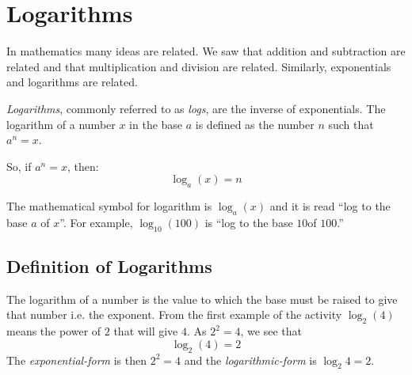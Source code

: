 \chapter{Logarithms}
\label{m:f12:logarithms}


In mathematics many ideas are related. We saw that addition and subtraction are related and that multiplication and division are related. Similarly, exponentials and logarithms are related. 

\textit{Logarithms}, commonly referred to as \textit{logs}, are the inverse of exponentials. The logarithm of a number $x$ in the base $a$ is defined as the number $n$ such that $a^n = x$. 

So, if $a^n = x$, then:
\begin{equation}
\label{eq:mn:l}
\log_{a}(x) = n
\end{equation}


The mathematical symbol for logarithm is $\log_{a}(x)$ and it is read ``log to the base $a$ of $x$''. For example, $\log_{10}(100)$ is ``log to the base $10$of $100$.''


\section{Definition of Logarithms}
The logarithm of a number is the value to which the base must be raised to give that number i.e. the exponent.  From the first example of the activity $\log_{2}(4)$ means the power of $2$ that will give $4$.  As $2^2=4$, we see that
\begin{equation} 
\log_{2}(4) = 2
\end{equation}
The \textit{exponential-form} is then $2^2 = 4$  and the \textit{logarithmic-form} is $\log_{2}4=2$.


